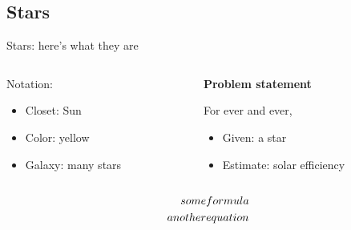 \subsection{Stars}

\begin{frame}{Stars: here's what they are}
\begin{columns}[T]
\begin{column}{0.55\linewidth}
Notation:
\begin{itemize}
    \item Closet: Sun
    \item Color: yellow
    \item Galaxy: many stars
\end{itemize}
\end{column}
\begin{column}{0.45\linewidth}
\textbf{Problem statement}

For ever and ever,
\begin{itemize}
    \item Given: a star
    \item Estimate: solar efficiency
\end{itemize}
\end{column}
\end{columns}
\bigskip
\begin{align*}
some& formula\\ \bigskip
another & equation
\end{align*}


\end{frame}

\newcommand{\myaddthis}[1]{{\visible<2->{\color{colorbrewer_green} #1}}}

